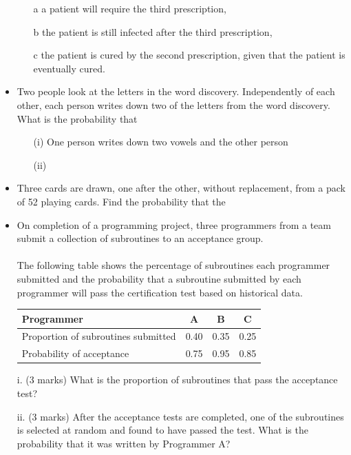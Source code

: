 \documentclass[12pt]{report}
\begin{document}
\begin{itemize}
	\begin{itemize}
		\item[a] a patient will require the third prescription,
		\item[b] the patient is still infected after the third prescription,
		\item[c] the patient is cured by the second prescription, given that the patient is eventually cured.
	\end{itemize}
	
	\item Two people look at the letters in the word discovery. Independently of each other, each person writes down two of the letters from the word discovery.
	What is the probability that
	\begin{itemize}
		\item[(i)] One person writes down two vowels and the other person 
		\item[(ii)]
	\end{itemize}
	
	\item Three cards are drawn, one after the other, without replacement, from a pack of 52 playing cards.
	Find the probability that the
	
	
	
	
	
	\item
	On completion of a programming project, three programmers from a team submit a collection of subroutines to an acceptance group. \\
	\\
	The following table shows the percentage of subroutines each programmer submitted and the probability that a subroutine submitted by each programmer will pass the certification test based on historical data.
	
	\begin{center}
		\begin{tabular}{|l|c|c|c|}
			\hline
			Programmer &	A	&B	& C	\\\hline
			Proportion of subroutines submitted&	0.40	&0.35	&0.25	\\ \hline
			Probability of acceptance	&0.75	&0.95	&0.85\\
			
			\hline
		\end{tabular}
	\end{center}
\end{itemize}
\begin{itemize}
	\item[i.] (3 marks) What is the proportion of subroutines that pass the acceptance test?
	\item[ii.](3 marks)  After the acceptance tests are completed, one of the subroutines is selected at random and found to have passed the test. What is the probability that it was written by Programmer A?
\end{itemize}
\end{document}
